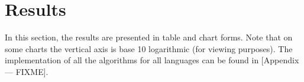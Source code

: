 \section{Results}
In this section, the results are presented in table and chart forms. Note that on some charts the vertical axis is base 10 logarithmic (for viewing purposes). The implementation of all the algorithms for all languages can be found in [Appendix --- FIXME].










